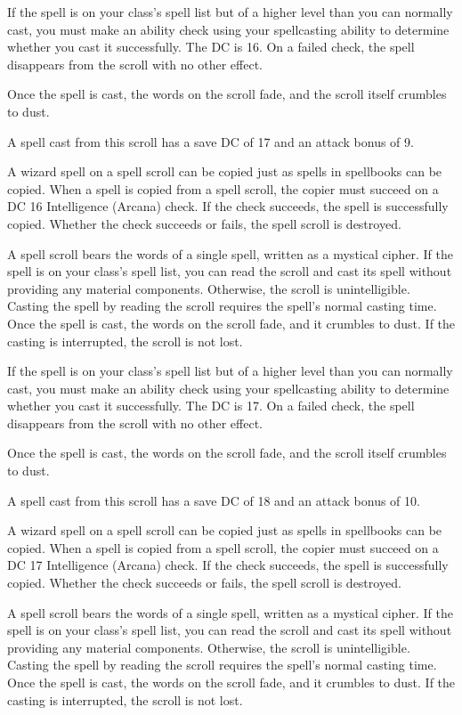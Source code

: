 \documentclass[10pt,a4paper,twoside,bg=print,twocolumn,openany,nodeprecatedcode]{dndbook}
\begin{document}
If the spell is on your class's spell list but of a higher level than you can normally cast, you must make an ability check using your spellcasting ability to determine whether you cast it successfully. The DC is 16. On a failed check, the spell disappears from the scroll with no other effect.

Once the spell is cast, the words on the scroll fade, and the scroll itself crumbles to dust.

A spell cast from this scroll has a save DC of 17 and an attack bonus of 9.

A wizard spell on a spell scroll can be copied just as spells in spellbooks can be copied. When a spell is copied from a spell scroll, the copier must succeed on a DC 16 Intelligence (Arcana) check. If the check succeeds, the spell is successfully copied. Whether the check succeeds or fails, the spell scroll is destroyed.

A spell scroll bears the words of a single spell, written as a mystical cipher. If the spell is on your class's spell list, you can read the scroll and cast its spell without providing any material components. Otherwise, the scroll is unintelligible. Casting the spell by reading the scroll requires the spell's normal casting time. Once the spell is cast, the words on the scroll fade, and it crumbles to dust. If the casting is interrupted, the scroll is not lost.

If the spell is on your class's spell list but of a higher level than you can normally cast, you must make an ability check using your spellcasting ability to determine whether you cast it successfully. The DC is 17. On a failed check, the spell disappears from the scroll with no other effect.

Once the spell is cast, the words on the scroll fade, and the scroll itself crumbles to dust.

A spell cast from this scroll has a save DC of 18 and an attack bonus of 10.

A wizard spell on a spell scroll can be copied just as spells in spellbooks can be copied. When a spell is copied from a spell scroll, the copier must succeed on a DC 17 Intelligence (Arcana) check. If the check succeeds, the spell is successfully copied. Whether the check succeeds or fails, the spell scroll is destroyed.

A spell scroll bears the words of a single spell, written as a mystical cipher. If the spell is on your class's spell list, you can read the scroll and cast its spell without providing any material components. Otherwise, the scroll is unintelligible. Casting the spell by reading the scroll requires the spell's normal casting time. Once the spell is cast, the words on the scroll fade, and it crumbles to dust. If the casting is interrupted, the scroll is not lost.
\end{document}
